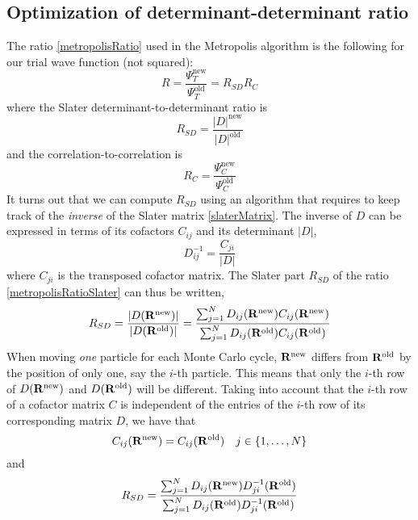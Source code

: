 \documentclass[english, a4paper]{article}
\begin{document}
\subsection{Optimization of determinant-determinant ratio}
The ratio \eqref{metropolisRatio} used in the Metropolis algorithm is the following 
for our trial wave function (not squared):
\begin{equation}
 R = \frac{\Psi_T^{\textrm{new}}}{\Psi_T^{\textrm{old}}} = 
 R_{SD}R_C
 \label{metropolisRatioSlater}
\end{equation}
where the Slater determinant-to-determinant ratio is
\begin{equation}
 R_{SD} = \frac{|D|^{\textrm{new}}}{|D|^{\textrm{old}}}
\end{equation}
and the correlation-to-correlation is 
\begin{equation}
 R_C = \frac{\Psi_C^{\textrm{new}}}{\Psi_C^{\textrm{old}}}
\end{equation}
It turns out that we can compute $R_{SD}$ using an algorithm that requires to keep track of the \textit{inverse}
of the Slater matrix \eqref{slaterMatrix}. The inverse of $D$ can be expressed in terms of its cofactors 
$C_{ij}$ and its determinant $|D|$,
\begin{equation}
 D_{ij}^{-1} = \frac{C_{ji}}{|D|}
\end{equation}
where $C_{ji}$ is the transposed cofactor matrix. 
The Slater part $R_{SD}$ of the ratio \eqref{metropolisRatioSlater} can thus be written,
\begin{equation}
 R_{SD} = \frac{|D({\bf R}^{\textrm{new}})|}{|D({\bf R}^{\textrm{old}})|}
  = \frac{\sum_{j=1}^N D_{ij}({\bf R}^{\textrm{new}}) C_{ij}({\bf R}^{\textrm{new}})}
  {\sum_{j=1}^N D_{ij}({\bf R}^{\textrm{old}}) C_{ij}({\bf R}^{\textrm{old}})}
\end{equation}
When moving \textit{one} particle for each Monte Carlo cycle, ${\bf R}^{\textrm{new}}$ differs from 
${\bf R}^{\textrm{old}}$ by the position of only one, say the $i$-th particle. This means that
only the $i$-th row of $D({\bf R}^{\textrm{new}})$
and $D({\bf R}^{\textrm{old}})$ will be different. Taking into account that the $i$-th row of a cofactor matrix
$C$ is independent of the entries of the $i$-th row of its corresponding matrix $D$, we have that
\begin{equation}
 C_{ij}({\bf R}^{\textrm{new}}) = C_{ij}({\bf R}^{\textrm{old}}) \quad j \in \{1,\dots,N\}
\end{equation}
and
\begin{equation}
 R_{SD} = \frac{\sum_{j=1}^N D_{ij}({\bf R}^{\textrm{new}}) D_{ji}^{-1}({\bf R}^{\textrm{old}})}
  {\sum_{j=1}^N D_{ij}({\bf R}^{\textrm{old}}) D_{ji}^{-1}({\bf R}^{\textrm{old}})}
\end{equation}
\end{document}

